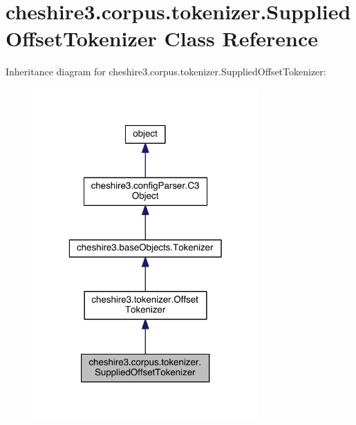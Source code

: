 \hypertarget{classcheshire3_1_1corpus_1_1tokenizer_1_1_supplied_offset_tokenizer}{\section{cheshire3.\-corpus.\-tokenizer.\-Supplied\-Offset\-Tokenizer Class Reference}
\label{classcheshire3_1_1corpus_1_1tokenizer_1_1_supplied_offset_tokenizer}
}


Inheritance diagram for cheshire3.\-corpus.\-tokenizer.\-Supplied\-Offset\-Tokenizer\-:
\nopagebreak
\begin{figure}[H]
\begin{center}
\leavevmode
\includegraphics[width=244pt]{classcheshire3_1_1corpus_1_1tokenizer_1_1_supplied_offset_tokenizer__inherit__graph}
\end{center}
\end{figure}


